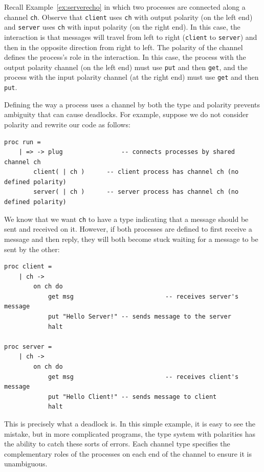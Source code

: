 \documentclass[11pt]{article}
\begin{document}
Recall Example~\ref{ex:serverecho} in which two processes are connected along a channel \lstinline$ch$.
Observe that \lstinline$client$ uses \lstinline$ch$ with output polarity (on the left end) and \lstinline$server$ uses \lstinline$ch$ with input polarity (on the right end).
In this case, the interaction is that messages will travel from left to right (\lstinline$client$ to \lstinline$server$) and then in the opposite direction from right to left.
The polarity of the channel defines the process's role in the interaction. 
In this case, the process with the output polarity channel (on the left end) must use \lstinline$put$ and then \lstinline$get$, and the process with the input polarity channel (at the right end) must use \lstinline$get$ and then \lstinline$put$. 

Defining the way a process uses a channel by both the type and polarity prevents ambiguity that can cause deadlocks.
For example, suppose we do not consider polarity and rewrite our code as follows:
\begin{lstlisting}[label=ex:ambiguityce, caption=Code without channel polarity (this code will not compile)] 
 proc run = 
 	| => -> plug				-- connects processes by shared channel ch
 		client( | ch )		-- client process has channel ch (no defined polarity)
 		server( | ch )		-- server process has channel ch (no defined polarity)
\end{lstlisting}

We know that we want \lstinline$ch$ to have a type indicating that a message should be sent and received on it.
However, if both processes are defined to first receive a message and then reply, they will both become stuck waiting for a message to be sent by the other:
\begin{lstlisting}
proc client = 
	| ch ->
		on ch do 
			get msg							-- receives server's message  
			put "Hello Server!"	-- sends message to the server      
			halt

proc server =  
	| ch ->
		on ch do
			get msg							-- receives client's message
			put "Hello Client!"	-- sends message to client
			halt
\end{lstlisting}
This is precisely what a deadlock is.
In this simple example, it is easy to see the mistake, but in more complicated programs, the type system with polarities has the ability to catch these sorts of errors.
Each channel type specifies the complementary roles of the processes on each end of the channel to ensure it is unambiguous.
\end{document}
